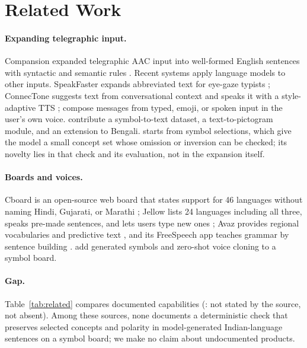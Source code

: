\section{Related Work}
\label{sec:related}

\paragraph{Expanding telegraphic input.}
Compansion expanded telegraphic AAC input into well-formed English sentences with syntactic and semantic rules \citep{mccoy1998compansion}.
Recent systems apply language models to other inputs. SpeakFaster expands abbreviated text for eye-gaze typists \citep{cai2024speakfaster}; ConnecTone suggests text from conversational context and speaks it with a style-adaptive TTS \citep{francis2024connectone}; \citet{mohan2024composition} compose messages from typed, emoji, or spoken input in the user's own voice.
\citet{karmakar-sinha-2024-aiding} contribute a symbol-to-text dataset, a text-to-pictogram module, and an extension to Bengali.
\sys{} starts from symbol selections, which give the model a small concept set whose omission or inversion can be checked; its novelty lies in that check and its evaluation, not in the expansion itself.

\paragraph{Boards and voices.}
Cboard is an open-source web board that states support for 46 languages without naming Hindi, Gujarati, or Marathi \citep{cboard}; Jellow lists 24 languages including all three, speaks pre-made sentences, and lets users type new ones \citep{jellow}; Avaz provides regional vocabularies and predictive text \citep{avaz}, and its FreeSpeech app teaches grammar by sentence building \citep{avazfreespeech}.
\citet{francis2025static} add generated symbols and zero-shot voice cloning to a symbol board.

\paragraph{Gap.}
Table~\ref{tab:related} compares documented capabilities (\nstated{}: not stated by the source, not absent).
Among these sources, none documents a deterministic check that preserves selected concepts and polarity in model-generated Indian-language sentences on a symbol board; we make no claim about undocumented products.


